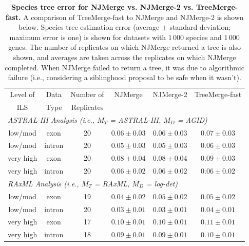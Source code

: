 \vspace{12pt}

\begin{table}[!h]
\caption{{\bf Species tree error for NJMerge vs. NJMerge-2 vs. TreeMerge-fast.}
A comparison of TreeMerge-fast to NJMerge and NJMerge-2 is shown below.
Species tree estimation error (average $\pm$ standard deviation; maximum error is one) is shown for datasets with  $1\,000$ species and  $1\,000$ genes.
The number of replicates on which NJMerge returned a tree is also shown, and averages are taken across the replicates on which NJMerge completed.
When NJMerge failed to return a tree, it was due to algorithmic failure (i.e., considering a siblinghood proposal to be safe when it wasn't).
}
\label{tab:treemerge-s1}
\centering
\begin{tabular}{cccccc}
\toprule
Level of & Data & Number of & NJMerge & NJMerge-2 & TreeMerge-fast \\
ILS & Type & Replicates &  &  & \\
\midrule
\multicolumn{6}{l}{\em ASTRAL-III Analysis (i.e., $M_T$ = ASTRAL-III, $M_D$ = AGID)}\\[0.5ex]
 low/mod & exon & 20 & $0.06 \pm 0.03$ & $0.06 \pm 0.03$ & $0.07 \pm 0.03$\\
 low/mod & intron & 20 & $0.05 \pm 0.03$ & $0.05 \pm 0.03$ & $0.06 \pm 0.03$\\
 very high & exon & 20 & $0.08 \pm 0.04$ & $0.08 \pm 0.04$ & $0.09 \pm 0.03$\\
 very high & intron & 20 & $0.06 \pm 0.02$ & $0.06 \pm 0.02$ & $0.06 \pm 0.02$\\[2ex]
\multicolumn{6}{l}{\em RAxML Analysis (i.e., $M_T$ = RAxML, $M_D$ = log-det)}\\[0.5ex]
 low/mod & exon & 19 & $0.04 \pm 0.02$ & $0.05 \pm 0.02$ & $0.05 \pm 0.02$\\
 low/mod & intron & 20 & $0.03 \pm 0.01$ & $0.03 \pm 0.01$ & $0.04 \pm 0.01$\\
 very high & exon & 17 & $0.10 \pm 0.01$ & $0.10 \pm 0.01$ & $0.11 \pm 0.01$\\
 very high & intron & 18 & $0.09 \pm 0.01$ & $0.09 \pm 0.01$ & $0.10 \pm 0.01$\\
\bottomrule
\end{tabular}
\end{table}

\clearpage

